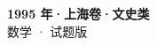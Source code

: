\documentclass[zihao=-4, a4paper]{ctexart}
\begin{document}
\begin{center}
  {\Large\bfseries 1995 年·上海卷·文史类}\\[4pt]
  {\large 数学 · 试题版}
\end{center}
\medskip
{}

\end{document}
